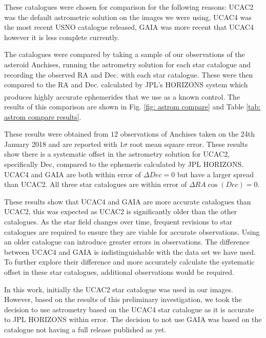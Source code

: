 \documentclass[10pt, twocolumn]{revtex4}    %
\newcommand{\scite}[1]{\textsuperscript{\cite{#1}}}
\begin{document}
These catalogues were chosen for comparison for the following reasons: UCAC2 was the default astrometric solution on the images we were using, UCAC4 was the most recent USNO catalogue released, GAIA was more recent that UCAC4 however it is less complete currently.

The catalogues were compared by taking a sample of our observations of the asteroid Anchises, running the astrometry solution for each star catalogue and recording the observed RA and Dec. with each star catalogue. These were then compared to the RA and Dec. calculated by JPL's HORIZONS system which produces highly accurate ephemerides that we use as a known control.\scite{HORIZONSSystem} The results of this comparison are shown in Fig. \ref{fig: astrom compare} and Table \ref{tab: astrom compare results}.

These results were obtained from  $12$ observations of Anchises taken on the 24th January 2018 and are reported with $1\sigma$ root mean square error. These results show there is a systematic offset in the astrometry solution for UCAC2, specifically Dec, compared to the ephemeris calculated by JPL HORIZONS. UCAC4 and GAIA are both within error of $\Delta Dec = 0$ but have a larger spread than UCAC2. All three star catalogues are within error of $\Delta RA \cos (Dec)=0$.

These results show that UCAC4 and GAIA are more accurate catalogues than UCAC2, this was expected as UCAC2 is significantly older than the other catalogues. As the star field changes over time, frequent revisions to star catalogues are required to ensure they are viable for accurate observations. Using an older catalogue can introduce greater errors in observations. The difference between UCAC4 and GAIA is indistinguishable with the data set we have used. To further explore their difference and more accurately calculate the systematic offset in these star catalogues, additional observations would be required.

In this work, initially the UCAC2 star catalogue was used in our images. However, based on the results of this preliminary investigation, we took the decision to use astrometry based on the UCAC4 star catalogue as it is accurate to JPL HORIZONS within error. The decision to not use GAIA was based on the catalogue not having a full release published as yet.
\end{document}
